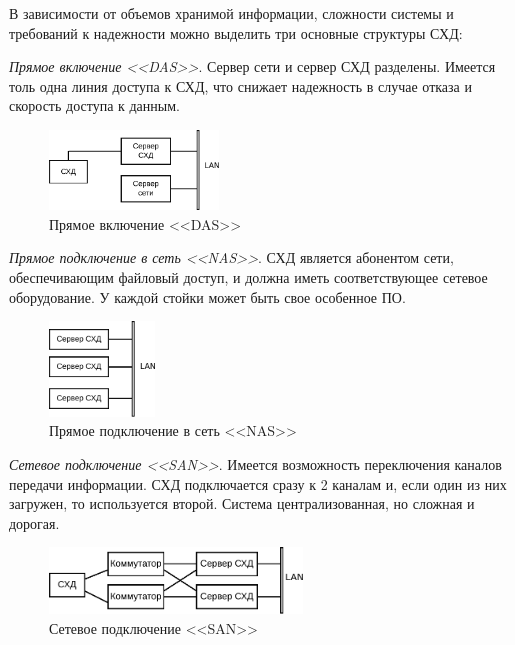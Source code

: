 \documentclass[unicode, 12pt, a4paper, oneside]{article}
\begin{document}
В зависимости от объемов хранимой информации, сложности системы и требований к надежности можно выделить три основные структуры СХД:

\textit{Прямое включение <<DAS>>}. Сервер сети и сервер СХД разделены. Имеется толь одна линия доступа к СХД, что снижает надежность в случае отказа и скорость доступа к данным.

\begin{figure}[H]
\centering
\includegraphics[width=0.4\textwidth]{151_das.pdf}
\caption{Прямое включение <<DAS>>}
\end{figure}

\textit{Прямое подключение в сеть <<NAS>>}. СХД является абонентом сети, обеспечивающим файловый доступ, и должна иметь соответствующее сетевое оборудование. У каждой стойки может быть свое особенное ПО.

\begin{figure}[H]
\centering
\includegraphics[width=0.25\textwidth]{151_nas.pdf}
\caption{Прямое подключение в сеть <<NAS>>}
\end{figure}

\textit{Сетевое подключение <<SAN>>}. Имеется возможность переключения каналов передачи информации. СХД подключается сразу к 2 каналам и, если один из них загружен, то используется второй. Система централизованная, но сложная и дорогая.

\begin{figure}[H]
\centering
\includegraphics[width=0.6\textwidth]{151_san.pdf}
\caption{Сетевое подключение <<SAN>>}
\end{figure}


\end{document}
